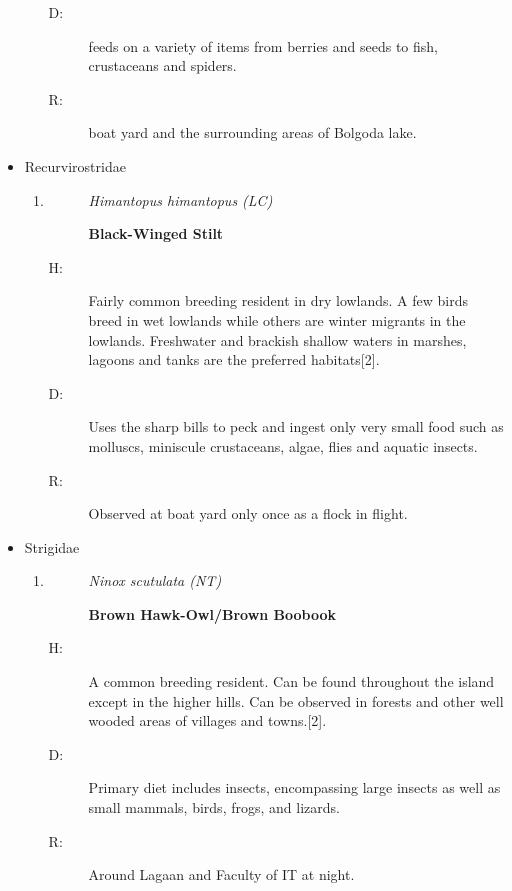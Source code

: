 \begin{itemize}
\begin{enumerate}
\begin{description}
\item[D: ]%
 feeds on a variety of items from berries and seeds to fish, crustaceans and spiders.%
\item[R: ]%
boat yard and the surrounding areas of Bolgoda lake.%
\end{description}%
\end{enumerate}%
\item%
Recurvirostridae%
\begin{enumerate}%
\item%
\begin{description}%
\item[]%
\textit{Himantopus himantopus (LC)}%
\item[]%
\textbf{Black{-}Winged Stilt}%
\end{description}%
\begin{description}%
\item[H: ]%
Fairly common breeding resident in dry lowlands. A few birds breed in wet lowlands while others are winter migrants in the lowlands. Freshwater and brackish shallow waters in marshes, lagoons and tanks are the preferred habitats{[}2{]}.%
\item[D: ]%
Uses the sharp bills to peck and ingest only very small food such as molluscs, miniscule crustaceans, algae, flies and aquatic insects.%
\item[R: ]%
Observed at boat yard only once as a flock in flight.%
\end{description}%
\end{enumerate}%
\item%
Strigidae%
\begin{enumerate}%
\item%
\begin{description}%
\item[]%
\textit{Ninox scutulata (NT)}%
\item[]%
\textbf{Brown Hawk{-}Owl/Brown Boobook}%
\end{description}%
\begin{description}%
\item[H: ]%
A common breeding resident. Can be found throughout the island except in the higher hills. Can be observed in forests and other well wooded areas of villages and towns.{[}2{]}.%
\item[D: ]%
Primary diet includes insects, encompassing large insects as well as small mammals, birds, frogs, and lizards.%
\item[R: ]%
Around Lagaan and Faculty of IT at night.%
\end{description}%

\end{enumerate}
\end{itemize}
